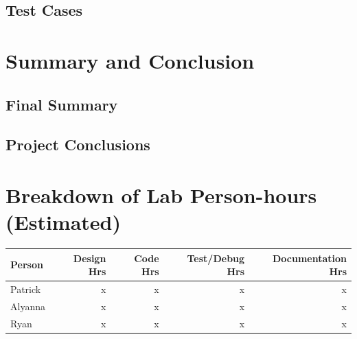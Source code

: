 \documentclass[12pt]{article} %
\begin{document}
\subsection{Test Cases} %
%

\section{Summary and Conclusion}
%

\subsection{Final Summary}


\subsection{Project Conclusions} %


\pagebreak
\appendix


\section{Breakdown of Lab Person-hours (Estimated)}
\begin{tabular}{|l|*{4}{r|}}
	\hline
	Person & Design Hrs & Code Hrs & Test/Debug Hrs & Documentation Hrs \\ \hline
	Patrick & x & x & x & x  \\ \hline
	Alyanna & x & x & x & x \\ \hline
	Ryan & x & x & x & x  \\ \hline
\end{tabular}

~\\
\end{document}

